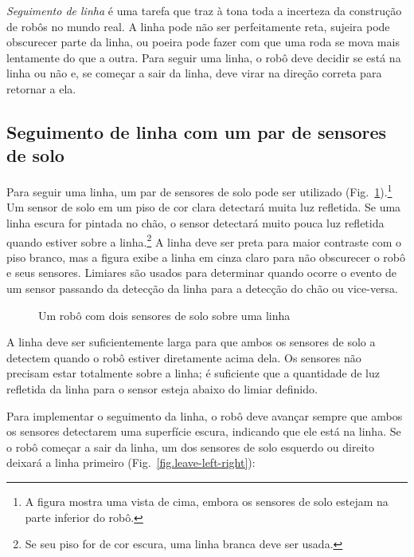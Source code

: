 \emph{Seguimento de linha} é uma tarefa que traz à tona toda a incerteza da construção de robôs no mundo real. A linha pode não ser perfeitamente reta, sujeira pode obscurecer parte da linha, ou poeira pode fazer com que uma roda se mova mais lentamente do que a outra. Para seguir uma linha, o robô deve decidir se está na linha ou não e, se começar a sair da linha, deve virar na direção correta para retornar a ela.

\subsection{Seguimento de linha com um par de sensores de solo}

Para seguir uma linha, um par de sensores de solo pode ser utilizado (Fig.~\ref{fig.ground-on-a-line}).\footnote{A figura mostra uma vista de cima, embora os sensores de solo estejam na parte inferior do robô.} Um sensor de solo em um piso de cor clara detectará muita luz refletida. Se uma linha escura for pintada no chão, o sensor detectará muito pouca luz refletida quando estiver sobre a linha.\footnote{Se seu piso for de cor escura, uma linha branca deve ser usada.} A linha deve ser preta para maior contraste com o piso branco, mas a figura exibe a linha em cinza claro para não obscurecer o robô e seus sensores. Limiares são usados para determinar quando ocorre o evento de um sensor passando da detecção da linha para a detecção do chão ou vice-versa.

\begin{figure}
\begin{center}
\caption{Um robô com dois sensores de solo sobre uma linha}\label{fig.ground-on-a-line}
\end{center}
\end{figure}

A linha deve ser suficientemente larga para que ambos os sensores de solo a detectem quando o robô estiver diretamente acima dela. Os sensores não precisam estar totalmente sobre a linha; é suficiente que a quantidade de luz refletida da linha para o sensor esteja abaixo do limiar definido.

Para implementar o seguimento da linha, o robô deve avançar sempre que ambos os sensores detectarem uma superfície escura, indicando que ele está na linha. Se o robô começar a sair da linha, um dos sensores de solo esquerdo ou direito deixará a linha primeiro (Fig.~\ref{fig.leave-left-right}):

